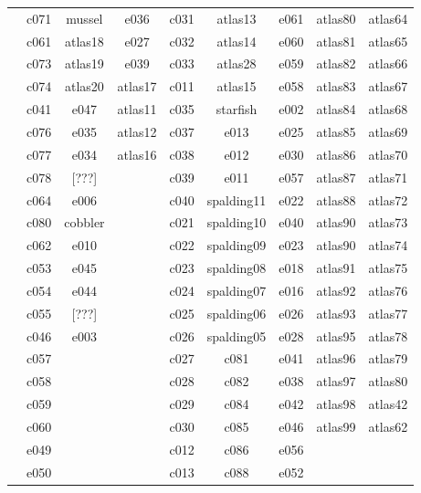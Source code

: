 \documentclass[10pt,letterpaper]{article}
\begin{document}
\begin{center}
\begin{tabular}{ |c|c|c|c|c|c|c|c|c| }
        & c071 & mussel  & e036    & c031 & atlas13    & e061 & atlas80 & atlas64 \\
        & c061 & atlas18 & e027    & c032 & atlas14    & e060 & atlas81 & atlas65 \\
        & c073 & atlas19 & e039    & c033 & atlas28    & e059 & atlas82 & atlas66 \\
        & c074 & atlas20 & atlas17 & c011 & atlas15    & e058 & atlas83 & atlas67 \\
        & c041 & e047    & atlas11 & c035 & starfish   & e002 & atlas84 & atlas68 \\
        & c076 & e035    & atlas12 & c037 & e013       & e025 & atlas85 & atlas69 \\
        & c077 & e034    & atlas16 & c038 & e012       & e030 & atlas86 & atlas70 \\
        & c078 & [???]   &         & c039 & e011       & e057 & atlas87 & atlas71 \\
        & c064 & e006    &         & c040 & spalding11 & e022 & atlas88 & atlas72 \\
        & c080 & cobbler &         & c021 & spalding10 & e040 & atlas90 & atlas73 \\
        & c062 & e010    &         & c022 & spalding09 & e023 & atlas90 & atlas74 \\
        & c053 & e045    &         & c023 & spalding08 & e018 & atlas91 & atlas75 \\
        & c054 & e044    &         & c024 & spalding07 & e016 & atlas92 & atlas76 \\
        & c055 & [???]   &         & c025 & spalding06 & e026 & atlas93 & atlas77 \\
        & c046 & e003    &         & c026 & spalding05 & e028 & atlas95 & atlas78 \\
        & c057 &         &         & c027 & c081       & e041 & atlas96 & atlas79 \\
        & c058 &         &         & c028 & c082       & e038 & atlas97 & atlas80 \\
        & c059 &         &         & c029 & c084       & e042 & atlas98 & atlas42 \\
        & c060 &         &         & c030 & c085       & e046 & atlas99 & atlas62 \\
        & e049 &         &         & c012 & c086       & e056 &         &         \\
        & e050 &         &         & c013 & c088       & e052 &         &         \\

\end{tabular}
\end{center}
\end{document}
